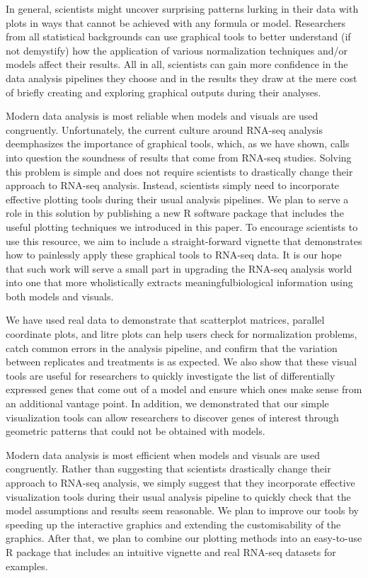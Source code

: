 \documentclass{bioinfo}
\begin{document}
In general, scientists might uncover surprising patterns lurking in their data with plots in ways that cannot be achieved with any formula or model. Researchers from all statistical backgrounds can use graphical tools to better understand (if not demystify) how the application of various normalization techniques and/or models affect their results. All in all, scientists can gain more confidence in the data analysis pipelines they choose and in the results they draw at the mere cost of briefly creating and exploring graphical outputs during their analyses.

Modern data analysis is most reliable when models and visuals are used congruently. Unfortunately, the current culture around RNA-seq analysis deemphasizes the importance of graphical tools, which, as we have shown, calls into question the soundness of results that come from RNA-seq studies. Solving this problem is simple and does not require scientists to drastically change their approach to RNA-seq analysis. Instead, scientists simply need to incorporate effective plotting tools during their usual analysis pipelines. We plan to serve a role in this solution by publishing a new \textsf{R} software package that includes the useful plotting techniques we introduced in this paper. To encourage scientists to use this resource, we aim to include a straight-forward vignette that demonstrates how to painlessly apply these graphical tools to RNA-seq data. It is our hope that such work will serve a small part in upgrading the RNA-seq analysis world into one that more wholistically extracts meaningfulbiological information using both models and visuals. 

We have used real data to demonstrate that scatterplot matrices, parallel coordinate plots, and litre plots can help users check for normalization problems, catch common errors in the analysis pipeline, and confirm that the variation between replicates and treatments is as expected. We also show that these visual tools are useful for researchers to quickly investigate the list of differentially expressed genes that come out of a model and ensure which ones make sense from an additional vantage point. In addition, we demonstrated that our simple visualization tools can allow researchers to discover genes of interest through geometric patterns that could not be obtained with models.

Modern data analysis is most efficient when models and visuals are used congruently. Rather than suggesting that scientists drastically change their approach to RNA-seq analysis, we simply suggest that they incorporate effective visualization tools during their usual analysis pipeline to quickly check that the model assumptions and results seem reasonable. We plan to improve our tools by speeding up the interactive graphics and extending the customisability of the graphics. After that, we plan to combine our plotting methods into an easy-to-use \textsf{R} package that includes an intuitive vignette and real RNA-seq datasets for examples. 
\end{document}
